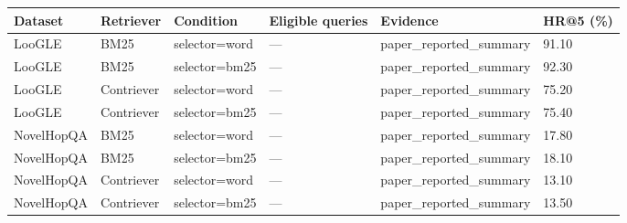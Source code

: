 \begin{tabular}{llllll}
\hline
Dataset & Retriever & Condition & Eligible queries & Evidence & HR@5 (\%) \\
\hline
LooGLE & BM25 & selector=word & — & paper\_reported\_summary & 91.10 \\
LooGLE & BM25 & selector=bm25 & — & paper\_reported\_summary & 92.30 \\
LooGLE & Contriever & selector=word & — & paper\_reported\_summary & 75.20 \\
LooGLE & Contriever & selector=bm25 & — & paper\_reported\_summary & 75.40 \\
NovelHopQA & BM25 & selector=word & — & paper\_reported\_summary & 17.80 \\
NovelHopQA & BM25 & selector=bm25 & — & paper\_reported\_summary & 18.10 \\
NovelHopQA & Contriever & selector=word & — & paper\_reported\_summary & 13.10 \\
NovelHopQA & Contriever & selector=bm25 & — & paper\_reported\_summary & 13.50 \\
\hline
\end{tabular}
